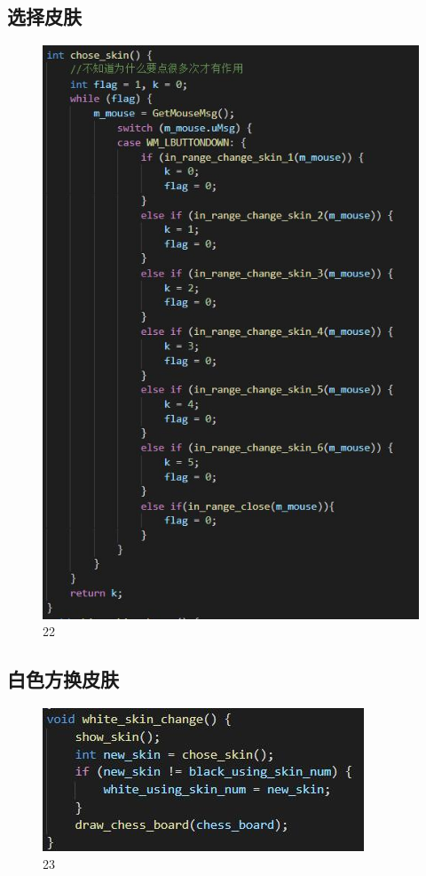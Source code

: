 \documentclass[UTF8]{ctexart}
\begin{document}
\subsection{选择皮肤}
\begin{figure}[H]
    \centering
    \includegraphics[scale=1.0]{21.jpg}
\caption{22}
\end{figure}
\subsection{白色方换皮肤}
\begin{figure}[H]
    \centering
    \includegraphics[scale=1.0]{22.jpg}
\caption{23}
\end{figure}
\end{document}
